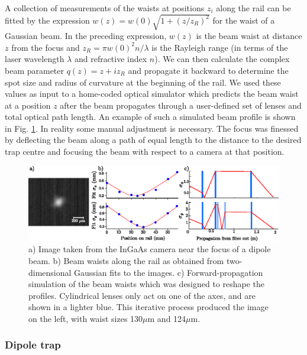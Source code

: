 	A collection of measurements of the waists at positions $z_i$ along the rail can be fitted by the expression $w(z) = w(0)\sqrt{1 + (z/z_R)^2}$ for the waist of a Gaussian beam.
	In the preceding expression, $w(z)$ is the beam waist at distance $z$ from the focus and $z_R=\pi w(0)^2n/\lambda$ is the Rayleigh range (in terms of the laser wavelength $\lambda$ and refractive index $n$).
	We can then calculate the complex beam parameter $q(z) = z + i z_R$ and propagate it backward to determine the spot size and radius of curvature at the beginning of the rail.
	We used these values as input to a home-coded optical simulator which predicts the beam waist at a position $z$ after the beam propagates through a user-defined set of lenses and total optical path length.
	An example of such a simulated beam profile is shown in Fig. \ref{fig:profiling}.
	In reality some manual adjustment is necessary.
	The focus was finessed by deflecting the beam along a path of equal length to the distance to the desired trap centre and focusing the beam with respect to a camera at that position.

	\begin{figure}
	\includegraphics[width=\textwidth]{fig/lattice/dipole_profle_combo}
	\caption{a) Image taken from the InGaAs camera near the focus of a dipole beam.
	b) Beam waists along the rail as obtained from two-dimensional Gaussian fits to the images.
	c) Forward-propagation simulation of the beam waists which was designed to reshape the profiles.
	Cylindrical lenses only act on one of the axes, and are shown in a lighter blue.
	This iterative process produced the image on the left, with waist sizes 130$\mu$m and 124$\mu$m.}
	\label{fig:profiling}
	\end{figure}



\subsubsection{Dipole trap}
\label{sec:dipole_trap}

